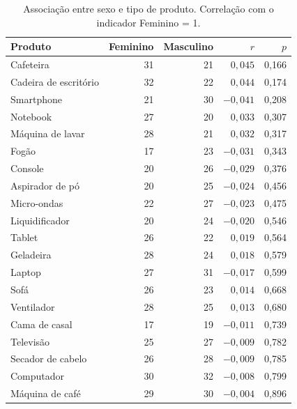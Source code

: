 \begin{table}[H]
    \centering
    \caption{Associação entre sexo e tipo de produto. Correlação com o indicador Feminino = 1.}
    \label{tab:q6-sexo}
    \scriptsize
    \setlength{\tabcolsep}{3pt}
    \begin{tabular}{@{}lrrrr@{}}
        \toprule
        Produto & Feminino & Masculino & \(r\) & \(p\) \\
        \midrule
        Cafeteira              & 31 & 21 & $0{,}045$  & 0,166 \\
        Cadeira de escritório  & 32 & 22 & $0{,}044$  & 0,174 \\
        Smartphone             & 21 & 30 & $-0{,}041$ & 0,208 \\
        Notebook               & 27 & 20 & $0{,}033$  & 0,307 \\
        Máquina de lavar       & 28 & 21 & $0{,}032$  & 0,317 \\
        Fogão                  & 17 & 23 & $-0{,}031$ & 0,343 \\
        Console                & 20 & 26 & $-0{,}029$ & 0,376 \\
        Aspirador de pó        & 20 & 25 & $-0{,}024$ & 0,456 \\
        Micro-ondas            & 22 & 27 & $-0{,}023$ & 0,475 \\
        Liquidificador         & 20 & 24 & $-0{,}020$ & 0,546 \\
        Tablet                 & 26 & 22 & $0{,}019$  & 0,564 \\
        Geladeira              & 28 & 24 & $0{,}018$  & 0,579 \\
        Laptop                 & 27 & 31 & $-0{,}017$ & 0,599 \\
        Sofá                   & 26 & 23 & $0{,}014$  & 0,668 \\
        Ventilador             & 28 & 25 & $0{,}013$  & 0,680 \\
        Cama de casal          & 17 & 19 & $-0{,}011$ & 0,739 \\
        Televisão              & 25 & 27 & $-0{,}009$ & 0,782 \\
        Secador de cabelo      & 26 & 28 & $-0{,}009$ & 0,785 \\
        Computador             & 30 & 32 & $-0{,}008$ & 0,799 \\
        Máquina de café        & 29 & 30 & $-0{,}004$ & 0,896 \\
        \bottomrule
    \end{tabular}
\end{table}

